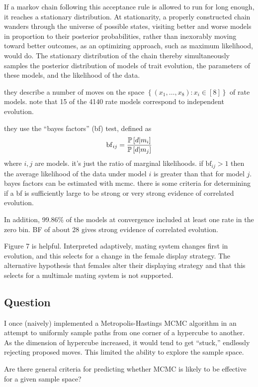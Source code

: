\documentclass{article}
\def\[{\left [} \def\]{\right ]} \def\({\left (} \def\){\right )}
\begin{document}
If a markov chain following this acceptance rule is allowed to run for long
enough, it reaches a stationary distribution. At stationarity, a properly
constructed chain wanders through the universe of possible states, visiting
better and worse models in proportion to their posterior probabilities, rather
than inexorably moving toward better outcomes, as an optimizing approach, such
as maximum likelihood, would do. The stationary distribution of the chain
thereby simultaneously samples the posterior distribution of models of trait
evolution, the parameters of these models, and the likelihood of the data.
  
they describe a number of moves on the space $\left\{ (x_{1},\ldots,x_{8}):
x_{i}\in [8] \right\}$ of rate models. note that 15 of the 4140 rate models
correspond to independent evolution.

they use the ``bayes factors'' (bf) test, defined as
\begin{equation*} \mathrm{bf}_{ij}=\frac{\P\[ d|m_{i} \]}{\P\[ d|m_{j} \]}
\end{equation*} where $i,j$ are models. it's just the ratio of marginal
likelihoods. if $\mathrm{bf}_{ij}>1$ then the average likelihood of the data
under model $i$ is greater than that for model $j$. bayes factors can be
estimated with mcmc. there is some criteria for determining if a bf is
sufficiently large to be strong or very strong evidence of correlated evolution.


In addition, 99.86\% of the models at convergence included at least one rate in
the zero bin. BF of about 28 gives strong evidence of correlated evolution.

Figure 7 is helpful. Interpreted adaptively, mating system changes first in
evolution, and this selects for a change in the female display strategy. The
alternative hypothesis that females alter their displaying strategy and that
this selects for a multimale mating system is not supported.


\subsection{Question} I once (naively) implemented a Metropolis-Hastings MCMC
algorithm in an attempt to uniformly sample paths from one corner of a hypercube
to another. As the dimension of hypercube increased, it would tend to get
``stuck,'' endlessly rejecting proposed moves. This limited the ability to
explore the sample space.

Are there general criteria for predicting whether MCMC is likely to be
effective for a given sample space?
\end{document}

